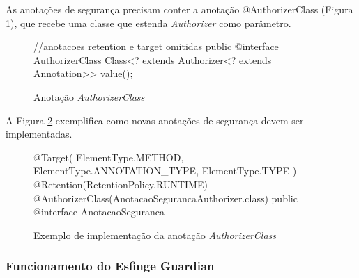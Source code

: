 \par As anotações de segurança precisam conter a anotação @AuthorizerClass (Figura \ref{fig:anotacao-authorizer-class}), que recebe uma classe que estenda \textit{Authorizer} como parâmetro.

\begin{figure}[H]
    \centering
    \begin{java}
//anotacoes retention e target omitidas
public @interface AuthorizerClass {
	Class<? extends Authorizer<? extends Annotation>> value();
}

    \end{java}
    \caption{Anotação \textit{AuthorizerClass}}
    \label{fig:anotacao-authorizer-class}
\end{figure}

\par A Figura \ref{fig:anotacao-seguranca} exemplifica como novas anotações de segurança devem ser implementadas.

\begin{figure}[H]
    \centering
    \begin{java}
@Target({ ElementType.METHOD, ElementType.ANNOTATION_TYPE, ElementType.TYPE })
@Retention(RetentionPolicy.RUNTIME)
@AuthorizerClass(AnotacaoSegurancaAuthorizer.class) 
public @interface AnotacaoSeguranca { 
}
    \end{java}
    \caption{Exemplo de implementação da anotação \textit{AuthorizerClass}}
    \label{fig:anotacao-seguranca}
\end{figure}

\subsubsection{Funcionamento do Esfinge Guardian}

